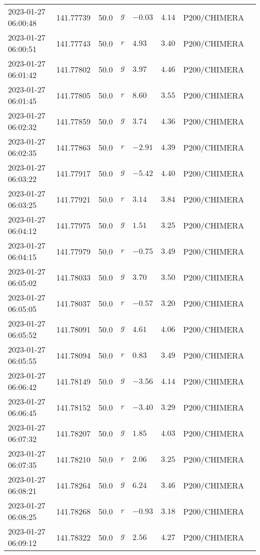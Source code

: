 \documentclass{nature_plusfigure}
\begin{document}
\begin{supplement}
\begin{center}
\begin{longtable}{llllllll}
2023-01-27 06:00:48 & 141.77739 & 50.0 & $g$ & $-0.03$ & $4.14$ & P200/CHIMERA &  \\ 
2023-01-27 06:00:51 & 141.77743 & 50.0 & $r$ & $4.93$ & $3.40$ & P200/CHIMERA &  \\ 
2023-01-27 06:01:42 & 141.77802 & 50.0 & $g$ & $3.97$ & $4.46$ & P200/CHIMERA &  \\ 
2023-01-27 06:01:45 & 141.77805 & 50.0 & $r$ & $8.60$ & $3.55$ & P200/CHIMERA &  \\ 
2023-01-27 06:02:32 & 141.77859 & 50.0 & $g$ & $3.74$ & $4.36$ & P200/CHIMERA &  \\ 
2023-01-27 06:02:35 & 141.77863 & 50.0 & $r$ & $-2.91$ & $4.39$ & P200/CHIMERA &  \\ 
2023-01-27 06:03:22 & 141.77917 & 50.0 & $g$ & $-5.42$ & $4.40$ & P200/CHIMERA &  \\ 
2023-01-27 06:03:25 & 141.77921 & 50.0 & $r$ & $3.14$ & $3.84$ & P200/CHIMERA &  \\ 
2023-01-27 06:04:12 & 141.77975 & 50.0 & $g$ & $1.51$ & $3.25$ & P200/CHIMERA &  \\ 
2023-01-27 06:04:15 & 141.77979 & 50.0 & $r$ & $-0.75$ & $3.49$ & P200/CHIMERA &  \\ 
2023-01-27 06:05:02 & 141.78033 & 50.0 & $g$ & $3.70$ & $3.50$ & P200/CHIMERA &  \\ 
2023-01-27 06:05:05 & 141.78037 & 50.0 & $r$ & $-0.57$ & $3.20$ & P200/CHIMERA &  \\ 
2023-01-27 06:05:52 & 141.78091 & 50.0 & $g$ & $4.61$ & $4.06$ & P200/CHIMERA &  \\ 
2023-01-27 06:05:55 & 141.78094 & 50.0 & $r$ & $0.83$ & $3.49$ & P200/CHIMERA &  \\ 
2023-01-27 06:06:42 & 141.78149 & 50.0 & $g$ & $-3.56$ & $4.14$ & P200/CHIMERA &  \\ 
2023-01-27 06:06:45 & 141.78152 & 50.0 & $r$ & $-3.40$ & $3.29$ & P200/CHIMERA &  \\ 
2023-01-27 06:07:32 & 141.78207 & 50.0 & $g$ & $1.85$ & $4.03$ & P200/CHIMERA &  \\ 
2023-01-27 06:07:35 & 141.78210 & 50.0 & $r$ & $2.06$ & $3.25$ & P200/CHIMERA &  \\ 
2023-01-27 06:08:21 & 141.78264 & 50.0 & $g$ & $6.24$ & $3.46$ & P200/CHIMERA &  \\ 
2023-01-27 06:08:25 & 141.78268 & 50.0 & $r$ & $-0.93$ & $3.18$ & P200/CHIMERA &  \\ 
2023-01-27 06:09:12 & 141.78322 & 50.0 & $g$ & $2.56$ & $4.27$ & P200/CHIMERA &  \\ 

\end{longtable}
\end{center}
\end{supplement}
\end{document}
